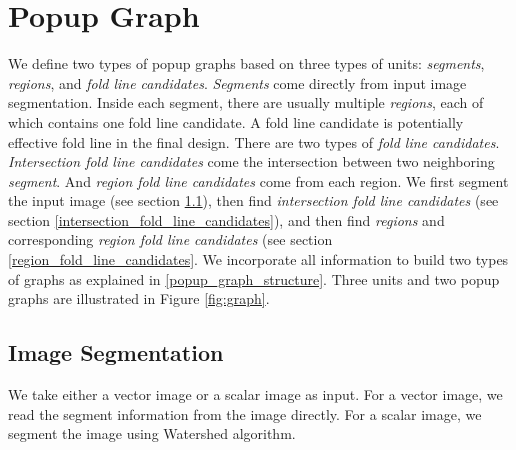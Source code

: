 \section{Popup Graph}
We define two types of popup graphs based on three types of units: \textit{segments}, \textit{regions}, and \textit{fold line candidates}. \textit{Segments} come directly from input image segmentation. Inside each segment, there are usually multiple \textit{regions}, each of which contains one fold line candidate. A fold line candidate is potentially effective fold line in the final design. There are two types of \textit{fold line candidates}. \textit{Intersection fold line candidates} come the intersection between two neighboring \textit{segment}. And \textit{region fold line candidates} come from each region. We first segment the input image (see section \ref{image_segmentation}), then find \textit{intersection fold line candidates} (see section \ref{intersection_fold_line_candidates}), and then find \textit{regions} and corresponding \textit{region fold line candidates} (see section \ref{region_fold_line_candidates}. We incorporate all information to build two types of graphs as explained in \ref{popup_graph_structure}.  Three units and two popup graphs are illustrated in Figure \ref{fig:graph}.

\subsection{Image Segmentation} \label{image_segmentation}
We take either a vector image or a scalar image as input. For a vector image, we read the segment information from the image directly. For a scalar image, we segment the image using Watershed algorithm.

